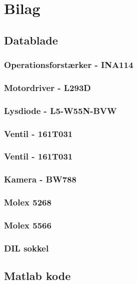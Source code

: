\chapter{Bilag}
\section{Datablade}

\subsection{Operationsforstærker - INA114}
\label{bilag:INA114}

\subsection{Motordriver - L293D}
\label{bilag:L293D}

\subsection{Lysdiode - L5-W55N-BVW}
\label{bilag:L5-W55N-BVW}

\subsection{Ventil - 161T031}
\label{bilag:ventil}

\subsection{Ventil - 161T031}
\label{bilag:ventil}

\subsection{Kamera - BW788}

\subsection{Molex 5268}

\subsection{Molex 5566}

\subsection{DIL sokkel}

\section{Matlab kode}
